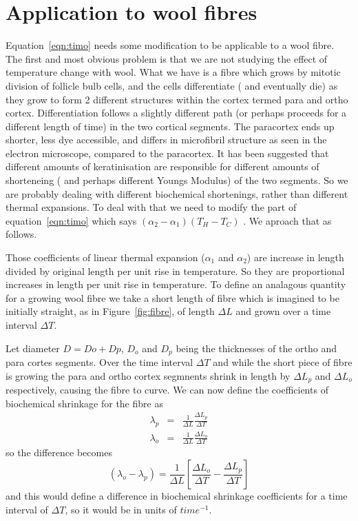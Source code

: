 \documentclass[titlepage]{article}  %
\begin{document}
\section{Application to wool fibres}
 Equation~\ref{eqn:timo} needs some modification to be applicable to a wool fibre. The first and most obvious problem is that we are not studying the effect of temperature change with wool. What we have is a fibre which grows by mitotic division of follicle bulb cells, and the cells differentiate ( and eventually die) as they grow to form 2 different structures within the cortex termed para and ortho cortex. Differentiation follows a slightly different path (or perhaps proceeds for a different length of time) in the two cortical segments. The paracortex ends up shorter, less dye accessible, and differs in microfibril structure as seen in the electron microscope, compared to the paracortex. It has been suggested that different amounts of keratinisation are responsible for different amounts of shorteneing ( and perhaps different Youngs Modulus) of the two segments. So we are probably dealing with different biochemical shortenings, rather than different thermal expansions. To deal with that we need to modify the part of equation~\ref{eqn:timo} which says $(\alpha_{2}- \alpha_{1})(T_{H} - T_{C})$ . We aproach that as follows.

  Those coefficients of linear thermal expansion ($\alpha_{1}$ and $\alpha_{2}$) are increase in length divided by original length per unit rise in temperature. So they are proportional increases in length per unit rise in temperature. To define an analagous quantity for a growing wool fibre we take a short length of fibre which is imagined to be initially straight, as in Figure~\ref{fig:fibre}, of length $\Delta L$ and grown over a time interval $\Delta T$.

 Let diameter $D = Do + Dp$, $D_{o}$ and $D_{p}$ being the thicknesses of the ortho and para cortes segments. Over  the time interval $\Delta T$ and while the short piece of fibre is growing the para and ortho cortex segmnents shrink in length by $\Delta L_{p}$ and $\Delta L_{o}$ respectively, causing the fibre to curve. We can now define the coefficients of  biochemical shrinkage for the fibre as 
\begin{eqnarray*}
 \lambda_{p} & = & \frac{1}{\Delta L} \frac{\Delta L_{p}}{\Delta T} \\
 \lambda_{o} & = & \frac{1}{\Delta L} \frac{\Delta L_{o}}{\Delta T}
\end{eqnarray*}
so the difference becomes
\begin{displaymath}
  (\lambda_{o} - \lambda_{p}) = \frac{1}{\Delta L} \left[ \frac{\Delta L_{o}}{\Delta T} - \frac{\Delta L_{p}}{\Delta T} \right]
\end{displaymath}
and this would define a difference in biochemical shrinkage coefficients for a time interval of $\Delta T$, so it would be in units of $time^{-1}$.
\end{document}
